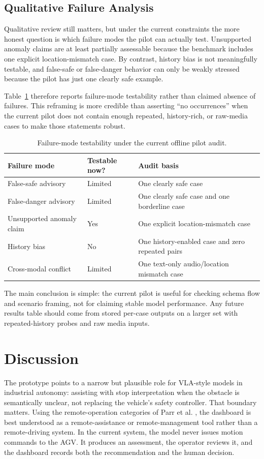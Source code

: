 \documentclass[conference]{IEEEtran}
\begin{document}
\subsection{Qualitative Failure Analysis}
Qualitative review still matters, but under the current constraints the more honest question is which failure modes the pilot can actually test. Unsupported anomaly claims are at least partially assessable because the benchmark includes one explicit location-mismatch case. By contrast, history bias is not meaningfully testable, and false-safe or false-danger behavior can only be weakly stressed because the pilot has just one clearly safe example.

Table~\ref{tab:failure} therefore reports failure-mode testability rather than claimed absence of failures. This reframing is more credible than asserting ``no occurrences'' when the current pilot does not contain enough repeated, history-rich, or raw-media cases to make those statements robust.

\begin{table}[t]
\caption{Failure-mode testability under the current offline pilot audit.}
\label{tab:failure}
\centering
\footnotesize
\begin{tabularx}{\linewidth}{@{}lXX@{}}
\toprule
Failure mode & Testable now? & Audit basis \\
\midrule
False-safe advisory & Limited & One clearly safe case \\
False-danger advisory & Limited & One clearly safe case and one borderline case \\
Unsupported anomaly claim & Yes & One explicit location-mismatch case \\
History bias & No & One history-enabled case and zero repeated pairs \\
Cross-modal conflict & Limited & One text-only audio/location mismatch case \\
\bottomrule
\end{tabularx}
\end{table}

\noindent The main conclusion is simple: the current pilot is useful for checking schema flow and scenario framing, not for claiming stable model performance. Any future results table should come from stored per-case outputs on a larger set with repeated-history probes and raw media inputs.

\section{Discussion}
The prototype points to a narrow but plausible role for VLA-style models in industrial autonomy: assisting with stop interpretation when the obstacle is semantically unclear, not replacing the vehicle's safety controller. That boundary matters. Using the remote-operation categories of Parr et al. \cite{parr2024remote}, the dashboard is best understood as a remote-assistance or remote-management tool rather than a remote-driving system. In the current system, the model never issues motion commands to the AGV. It produces an assessment, the operator reviews it, and the dashboard records both the recommendation and the human decision.
\end{document}

